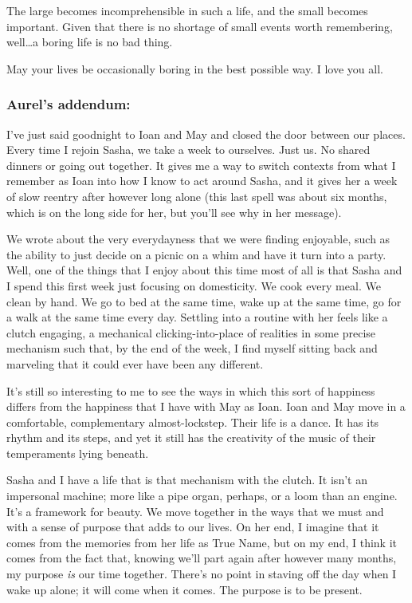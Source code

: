 The large becomes incomprehensible in such a life, and the small becomes important. Given that there is no shortage of small events worth remembering, well\ldots a boring life is no bad thing.

May your lives be occasionally boring in the best possible way. I love you all.

\hypertarget{aurels-addendum}{%
\subsubsection{Aurel's addendum:}\label{aurels-addendum}}

I've just said goodnight to Ioan and May and closed the door between our places. Every time I rejoin Sasha, we take a week to ourselves. Just us. No shared dinners or going out together. It gives me a way to switch contexts from what I remember as Ioan into how I know to act around Sasha, and it gives her a week of slow reentry after however long alone (this last spell was about six months, which is on the long side for her, but you'll see why in her message).

We wrote about the very everydayness that we were finding enjoyable, such as the ability to just decide on a picnic on a whim and have it turn into a party. Well, one of the things that I enjoy about this time most of all is that Sasha and I spend this first week just focusing on domesticity. We cook every meal. We clean by hand. We go to bed at the same time, wake up at the same time, go for a walk at the same time every day. Settling into a routine with her feels like a clutch engaging, a mechanical clicking-into-place of realities in some precise mechanism such that, by the end of the week, I find myself sitting back and marveling that it could ever have been any different.

It's still so interesting to me to see the ways in which this sort of happiness differs from the happiness that I have with May as Ioan. Ioan and May move in a comfortable, complementary almost-lockstep. Their life is a dance. It has its rhythm and its steps, and yet it still has the creativity of the music of their temperaments lying beneath.

Sasha and I have a life that is that mechanism with the clutch. It isn't an impersonal machine; more like a pipe organ, perhaps, or a loom than an engine. It's a framework for beauty. We move together in the ways that we must and with a sense of purpose that adds to our lives. On her end, I imagine that it comes from the memories from her life as True Name, but on my end, I think it comes from the fact that, knowing we'll part again after however many months, my purpose \emph{is} our time together. There's no point in staving off the day when I wake up alone; it will come when it comes. The purpose is to be present.

